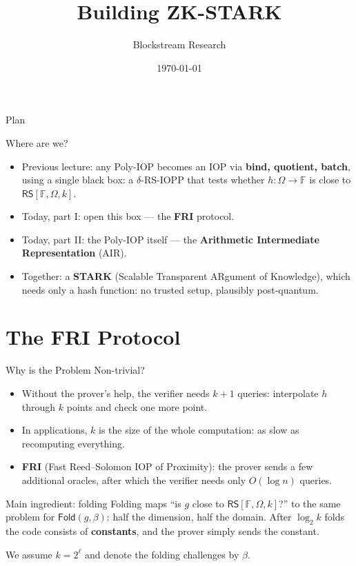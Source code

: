 \documentclass{zkdl-presentation-template}
\title[ZK-STARK]{\textbf{Building ZK-STARK}}
\author{Blockstream Research}
\date{\today}
\begin{document}
    \maketitleframe

    \begin{frame}{Plan}
      \tableofcontents[hideallsubsections]
    \end{frame}

    \begin{frame}{Where are we?}
        \begin{itemize}
            \item Previous lecture: any Poly-IOP becomes an IOP via \textbf{bind, quotient, batch}, using a single black box: a $\delta$-RS-IOPP that tests whether $h: \Omega \to \mathbb{F}$ is close to $\mathsf{RS}[\mathbb{F}, \Omega, k]$.\pause
            \item Today, part I: open this box --- the \textbf{FRI} protocol.\pause
            \item Today, part II: the Poly-IOP itself --- the \textbf{Arithmetic Intermediate Representation} (AIR).\pause
            \item Together: a \textbf{STARK} (Scalable Transparent ARgument of Knowledge), which needs only a hash function: no trusted setup, plausibly post-quantum.
        \end{itemize}
    \end{frame}

    \section{The FRI Protocol}

    \begin{frame}{Why is the Problem Non-trivial?}
        \begin{itemize}
            \item Without the prover's help, the verifier needs $k + 1$ queries: interpolate $h$ through $k$ points and check one more point.\pause
            \item In applications, $k$ is the size of the whole computation: as slow as recomputing everything.\pause
            \item \textbf{FRI} (Fast Reed--Solomon IOP of Proximity): the prover sends a few additional oracles, after which the verifier needs only $O(\log n)$ queries.
        \end{itemize}
        \pause

        \begin{remarkblock}{Main ingredient: folding}
            Folding maps ``is $g$ close to $\mathsf{RS}[\mathbb{F}, \Omega, k]$?'' to the same problem for $\mathsf{Fold}(g, \beta)$: half the dimension, half the domain. After $\log_2 k$ folds the code consists of \textbf{constants}, and the prover simply sends the constant.
        \end{remarkblock}
        We assume $k = 2^\ell$ and denote the folding challenges by $\beta$.
    \end{frame}
\end{document}
